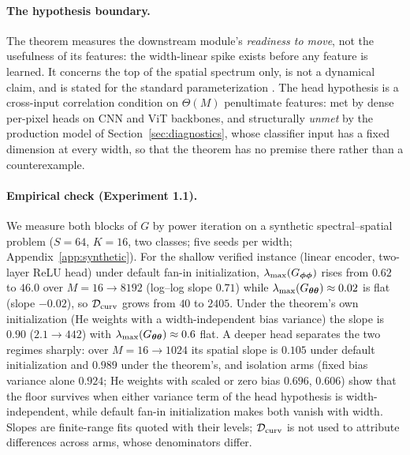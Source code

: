 \paragraph{The hypothesis boundary.}
The theorem measures the downstream module's \emph{readiness to move}, not
the usefulness of its features: the width-linear spike exists before any
feature is learned. It concerns the top of the spatial spectrum only, is not
a dynamical claim, and is stated for the standard parameterization
\citep{yang2021tensor}. The head hypothesis is a cross-input correlation
condition on $\Theta(M)$ penultimate features: met by dense per-pixel heads
on CNN and ViT backbones, and structurally \emph{unmet} by the production
model of Section~\ref{sec:diagnostics}, whose classifier input has a fixed
dimension at every width, so that the theorem has no premise there rather
than a counterexample.

\paragraph{Empirical check (Experiment 1.1).}
We measure both blocks of $G$ by power iteration on a synthetic
spectral--spatial problem ($S=64$, $K=16$, two classes; five seeds per
width; Appendix~\ref{app:synthetic}). For the shallow verified instance
(linear encoder, two-layer ReLU head) under default fan-in initialization,
$\lambda_{\max}(G_{{\boldsymbol{\phi}}{\boldsymbol{\phi}}})$ rises from $0.62$ to $46.0$ over
$M=16\to8192$ (log--log slope $0.71$) while
$\lambda_{\max}(G_{{\boldsymbol{\theta}}{\boldsymbol{\theta}}})\approx0.02$ is flat (slope $-0.02$), so
$\mathcal{D}_{\mathrm{curv}}$ grows from $40$ to $2405$. Under the theorem's own initialization
(He weights with a width-independent bias variance) the slope is $0.90$
($2.1\to442$) with $\lambda_{\max}(G_{{\boldsymbol{\theta}}{\boldsymbol{\theta}}})\approx0.6$ flat. A
deeper head separates the two regimes sharply: over $M=16\to1024$ its
spatial slope is $0.105$ under default initialization and $0.989$ under
the theorem's, and isolation arms (fixed bias variance alone $0.924$; He
weights with scaled or zero bias $0.696$, $0.606$) show that the floor
survives when either variance term of the head hypothesis is
width-independent, while default fan-in initialization makes both vanish
with width. Slopes are finite-range fits quoted with their levels; $\mathcal{D}_{\mathrm{curv}}$
is not used to attribute differences across arms, whose denominators differ.

